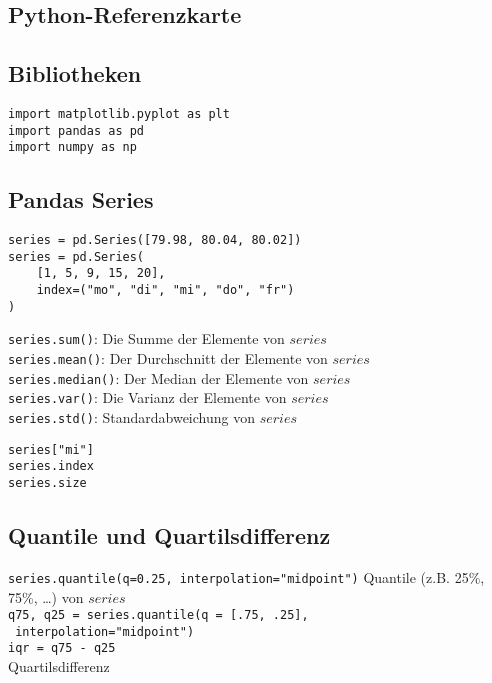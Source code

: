 \documentclass[14pt]{article}
\begin{document}
\begin{center}
	\section*{Python-Referenzkarte}
\end{center}
\begin{multicols}{3}

\subsection*{Bibliotheken}
\begin{verbatim}
import matplotlib.pyplot as plt
import pandas as pd
import numpy as np
\end{verbatim}

\subsection*{Pandas Series}
\begin{verbatim}
series = pd.Series([79.98, 80.04, 80.02])
series = pd.Series(
	[1, 5, 9, 15, 20],
	index=("mo", "di", "mi", "do", "fr")
)
\end{verbatim}

\texttt{series.sum()}: Die Summe der Elemente von $series$ \\
\texttt{series.mean()}: Der Durchschnitt der Elemente von $series$ \\
\texttt{series.median()}: Der Median der Elemente von $series$ \\
\texttt{series.var()}: Die Varianz der Elemente von $series$ \\
\texttt{series.std()}: Standardabweichung von $series$ 

\begin{verbatim}
series["mi"]
series.index
series.size
\end{verbatim}

\subsection*{Quantile und Quartilsdifferenz}
\texttt{series.quantile(q=0.25, interpolation="midpoint")}
Quantile (z.B. 25\%, 75\%, \dots) von $series$ \\

\texttt{q75, q25 = series.quantile(q = [.75, .25], \ } \\
\texttt{	interpolation="midpoint")} \\
\texttt{iqr = q75 - q25} \\
Quartilsdifferenz


\end{multicols}
\end{document}
